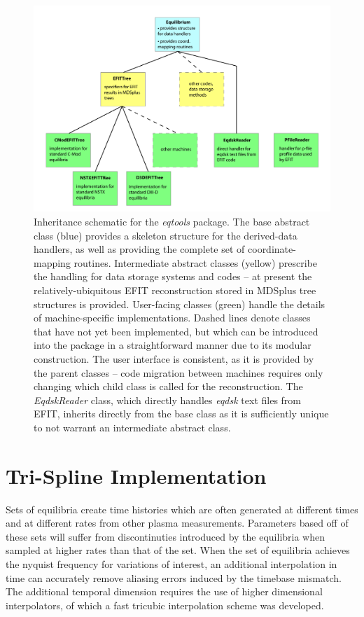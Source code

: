 \documentclass[12pt,floatfix,showpacs]{revtex4-1}
\begin{document}
\begin{figure}[p]
 \includegraphics[width=\textwidth]{graphics/flowchart.pdf}
 \caption{Inheritance schematic for the \emph{eqtools} package.  The base abstract class (blue) provides a skeleton structure for the derived-data handlers, as well as providing the complete set of coordinate-mapping routines.  Intermediate abstract classes (yellow) prescribe the handling for data storage systems and codes -- at present the relatively-ubiquitous EFIT reconstruction stored in MDSplus tree structures is provided.  User-facing classes (green) handle the details of machine-specific implementations.  Dashed lines denote classes that have not yet been implemented, but which can be introduced into the package in a straightforward manner due to its modular construction.  The user interface is consistent, as it is provided by the parent classes -- code migration between machines requires only changing which child class is called for the reconstruction.  The \emph{EqdskReader} class, which directly handles \emph{eqdsk} text files from EFIT, inherits directly from the base class as it is sufficiently unique to not warrant an intermediate abstract class.}
 \label{fig:flowchart}
\end{figure}

\section{Tri-Spline Implementation}\label{sec:trispline}

Sets of equilibria create time histories which are often generated at different times and at different rates from other plasma measurements. Parameters based off of these sets will suffer from discontinuties introduced by the equilibria when sampled at higher rates than that of the set.  When the set of equilibria achieves the nyquist frequency for variations of interest, an additional interpolation in time can accurately remove aliasing errors induced by the timebase mismatch. The additional temporal dimension requires the use of higher dimensional interpolators, of which a fast tricubic interpolation scheme was developed. 
\end{document}
